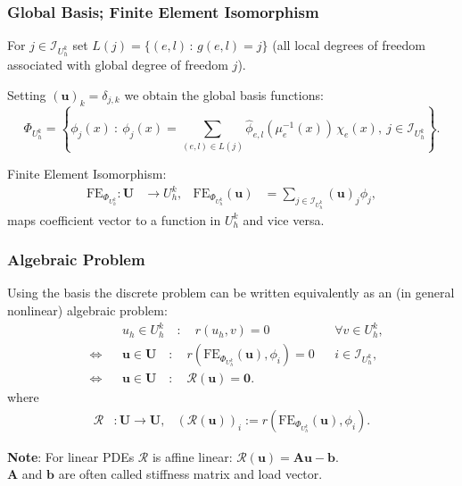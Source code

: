 \begin{frame}
\frametitle{Global Basis; Finite Element Isomorphism}
For $j\in \mathcal{I}_{U_h^k}$ set $L(j) = \{ (e,l) \, : \, g(e,l) = j\}$ (all local degrees
of freedom associated with global degree of freedom $j$).

Setting $(\mathbf{u})_k = \delta_{j,k}$ we obtain the global basis functions:
\begin{equation*}
\Phi_{U_h^k} = \left\{ \phi_j(x) \ : \ \phi_j(x) = \sum_{(e,l)\in L(j)} \hat{\phi}_{e,l}(\mu_e^{-1}(x)) \, \chi_e(x),
\ j \in \mathcal{I}_{U_h^k} \right\}.
\end{equation*}

Finite Element Isomorphism:
\begin{align*}
\text{FE}_{\Phi_{U_h^k}} : \mathbf{U} &\to U_h^k, &
\text{FE}_{\Phi_{U_h^k}}(\mathbf{u}) &= \sum_{j\in \mathcal{I}_{U_h^k}} (\mathbf{u})_j \phi_j,
\end{align*}
maps coefficient vector to a function in $U_h^k$ and vice versa.
\end{frame}

\begin{frame}
\frametitle{Algebraic Problem}
Using the basis the discrete problem can be written equivalently as an (in general nonlinear) algebraic problem:
\begin{align*}
&&& u_h \in U_h^k \quad : \quad r(u_h,v) = 0 && \forall v \in U_h^k,\\
&\Leftrightarrow && \mathbf{u}\in\mathbf{U} \quad : \quad
r\left(\text{FE}_{\Phi_{U_h^k}}(\mathbf{u}),\phi_i\right) = 0 &&
i\in\mathcal{I}_{U_h^k}, \\
&\Leftrightarrow && \mathbf{u}\in\mathbf{U} \quad : \quad
\mathcal{R}(\mathbf{u}) = \mathbf{0}.
\end{align*}
where
\begin{align*}
\mathcal{R} &: \mathbf{U} \to \mathbf{U}, &
\left(\mathcal{R}(\mathbf{u}) \right)_i :=  r\left(\text{FE}_{\Phi_{U_h^k}}(\mathbf{u}),\phi_i\right) .
\end{align*}

\textbf{Note}: For linear PDEs $\mathcal{R}$ is affine linear: $\mathcal{R}(\mathbf{u}) = \mathbf{A} \mathbf{u} - \mathbf{b}$.\\
$\mathbf{A}$ and $\mathbf{b}$  are often called stiffness matrix and load vector.
\end{frame}


